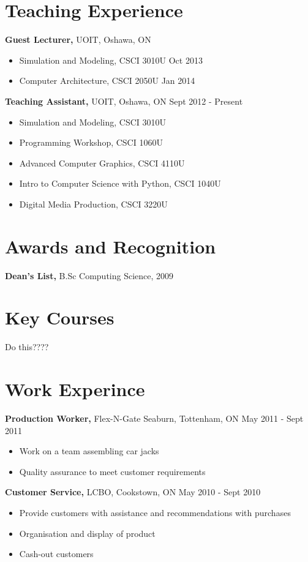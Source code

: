 \documentclass[margin]{res}
\begin{document}
\begin{resume}
\section{Teaching Experience} 
               {\bf Guest Lecturer,} UOIT, Oshawa, ON
                \begin{itemize} \itemsep -2pt
              \item Simulation and Modeling, CSCI 3010U \hfill Oct 2013
              \item  Computer Architecture, CSCI 2050U \hfill Jan 2014
              \end{itemize}

	 {\bf Teaching Assistant,} UOIT, Oshawa, ON \hfill   Sept 2012 - Present
            \begin{itemize} \itemsep -2pt
            \item  Simulation and Modeling, CSCI 3010U   
            \item Programming Workshop, CSCI 1060U
	 \item Advanced Computer Graphics, CSCI 4110U
	 \item Intro to Computer Science with Python, CSCI 1040U
	 \item Digital Media Production, CSCI 3220U
	 \end{itemize}

\section{Awards and Recognition}
	{\bf Dean's List,} B.Sc Computing Science, 2009

\section{Key Courses}
	Do this????

\section{Work Experince}
	{\bf Production Worker,} Flex-N-Gate Seaburn, Tottenham, ON \hfill May 2011 - Sept 2011
	\begin{itemize} \itemsep -2pt
	\item Work on a team assembling car jacks
	\item Quality assurance to meet customer requirements
	\end{itemize}

	{\bf Customer Service,} LCBO, Cookstown, ON \hfill May 2010 - Sept 2010
	\begin{itemize} \itemsep -2pt
	\item Provide customers with assistance and recommendations with purchases
	\item Organisation and display of product
	\item Cash-out customers
	\end{itemize}


\end{resume}
\end{document}
